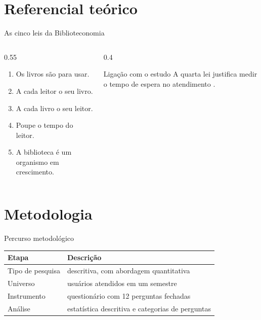 \section{Referencial teórico}
\begin{frame}{As cinco leis da Biblioteconomia}
  \begin{columns}[T]
    \begin{column}{0.55\textwidth}
      \begin{enumerate}
        \item Os livros são para usar.
        \item A cada leitor o seu livro.
        \item A cada livro o seu leitor.
        \item Poupe o tempo do leitor.
        \item A biblioteca é um organismo em crescimento.
      \end{enumerate}
    \end{column}
    \begin{column}{0.4\textwidth}
      \begin{alertblock}{Ligação com o estudo}
        A quarta lei justifica medir o tempo de espera no atendimento \cite{ranganathan1931}.
      \end{alertblock}
    \end{column}
  \end{columns}
\end{frame}

\section{Metodologia}
\begin{frame}{Percurso metodológico}
  \begin{table}
    \centering
    \begin{tabular}{@{}ll@{}}
      \toprule
      Etapa & Descrição \\
      \midrule
      Tipo de pesquisa & descritiva, com abordagem quantitativa \\
      Universo & usuários atendidos em um semestre \\
      Instrumento & questionário com 12 perguntas fechadas \\
      Análise & estatística descritiva e categorias de perguntas \\
      \bottomrule
    \end{tabular}
  \end{table}
\end{frame}

